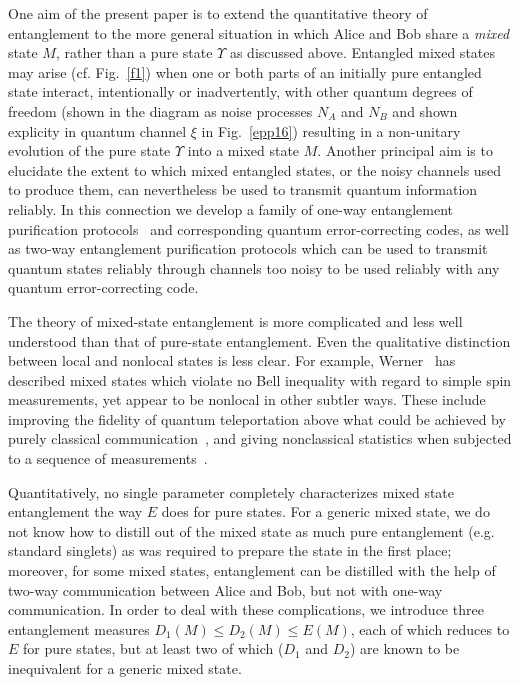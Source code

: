 One aim of the present paper is to extend the quantitative theory of
entanglement to the more general situation in which Alice and Bob
share a {\it mixed} state $M$, rather than a pure state $\Upsilon$ as
discussed above.  Entangled mixed states may arise (cf. Fig.~\ref{f1}) 
when one or both parts of an initially pure entangled
state interact, intentionally or inadvertently, with other quantum
degrees of freedom (shown in the diagram as noise processes $N_A$ and
$N_B$ and shown explicity in quantum channel $\xi$ in Fig.~\ref{epp16}) 
resulting in a non-unitary evolution of the pure state
$\Upsilon$ into a mixed state $M$.  Another principal aim is to
elucidate the extent to which mixed entangled states, or the noisy
channels used to produce them, can nevertheless be used to transmit
quantum information reliably.  In this connection we develop a family
of one-way entanglement purification protocols~\cite{purification} and
corresponding quantum error-correcting codes, as well as two-way
entanglement purification protocols which can be used to transmit
quantum states reliably through channels too noisy to be used reliably
with any quantum error-correcting code.
 
The theory of mixed-state entanglement is more complicated and less
well understood than that of pure-state entanglement. Even the
qualitative distinction between local and nonlocal states is less
clear.  For example, Werner~\cite{Werner} has described mixed states
which violate no Bell inequality with regard to simple spin
measurements, yet appear to be nonlocal in other subtler ways.  These
include improving the fidelity of quantum teleportation
above what could be achieved by purely classical
communication~\cite{Popescu1}, and giving nonclassical statistics when
subjected to a sequence of measurements~\cite{Popescu2}.
 
Quantitatively, no single parameter completely characterizes mixed
state entanglement the way $E$ does for pure states.  For a generic
mixed state, we do not know how to distill out of the mixed state as
much pure entanglement (e.g. standard singlets) as was required to
prepare the state in the first place; moreover, for some mixed states,
entanglement can be distilled with the help of two-way communication
between Alice and Bob, but not with one-way communication.  In order
to deal with these complications, we introduce three entanglement
measures $D_1(M)\leq D_2(M)\leq E(M)$, each of which reduces to $E$
for pure states, but at least two of which ($D_1$ and $D_2$) are known
to be inequivalent for a generic mixed state.
 
